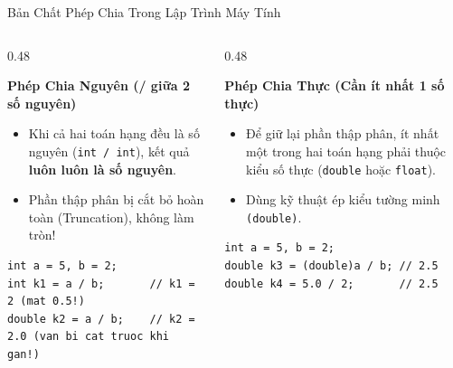 \documentclass[aspectratio=169, 10pt]{beamer}
\begin{document}
\begin{frame}[fragile]{Bản Chất Phép Chia Trong Lập Trình Máy Tính}
  \begin{columns}[T]
    \begin{column}{0.48\textwidth}
      \begin{alertblock}{\textbf{Phép Chia Nguyên (/ giữa 2 số nguyên)}}
        \begin{itemize}
          \item Khi cả hai toán hạng đều là số nguyên (\texttt{int / int}), kết quả \textbf{luôn luôn là số nguyên}.
          \item Phần thập phân bị cắt bỏ hoàn toàn (Truncation), không làm tròn!
        \end{itemize}
\begin{lstlisting}
int a = 5, b = 2;
int k1 = a / b;       // k1 = 2 (mat 0.5!)
double k2 = a / b;    // k2 = 2.0 (van bi cat truoc khi gan!)
\end{lstlisting}
      \end{alertblock}
    \end{column}
    \begin{column}{0.48\textwidth}
      \begin{exampleblock}{\textbf{Phép Chia Thực (Cần ít nhất 1 số thực)}}
        \begin{itemize}
          \item Để giữ lại phần thập phân, ít nhất một trong hai toán hạng phải thuộc kiểu số thực (\texttt{double} hoặc \texttt{float}).
          \item Dùng kỹ thuật ép kiểu tường minh \texttt{(double)}.
        \end{itemize}
\begin{lstlisting}
int a = 5, b = 2;
double k3 = (double)a / b; // 2.5
double k4 = 5.0 / 2;       // 2.5
\end{lstlisting}
      \end{exampleblock}
    \end{column}
  \end{columns}
\end{frame}
\end{document}
